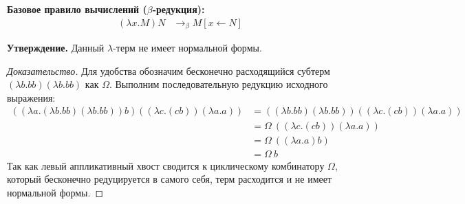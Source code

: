 \documentclass{article}
\begin{document}
\noindent\textbf{Базовое правило вычислений ($\beta$-редукция):}
\begin{align*}
    (\lambda x. M) N &\rightarrow_\beta M[x \leftarrow N]
\end{align*}

\noindent\textbf{Утверждение.} Данный $\lambda$-терм не имеет нормальной формы.

\begin{proof}[Доказательство]
Для удобства обозначим бесконечно расходящийся субтерм $(\lambda b. b b)(\lambda b. b b)$ как $\Omega$. Выполним последовательную редукцию исходного выражения:
\begin{align*}
    ((\lambda a. (\lambda b. b b) (\lambda b. b b)) b) ((\lambda c. (c b)) (\lambda a. a)) 
    &= ((\lambda b. b b) (\lambda b. b b)) ((\lambda c. (c b)) (\lambda a. a)) \\
    &= \Omega \ ((\lambda c. (c b)) (\lambda a. a)) \\
    &= \Omega \ ((\lambda a. a) b) \\
    &= \Omega \ b
\end{align*}
Так как левый аппликативный хвост сводится к циклическому комбинатору $\Omega$, который бесконечно редуцируется в самого себя, терм расходится и не имеет нормальной формы.
\end{proof}
\end{document}
